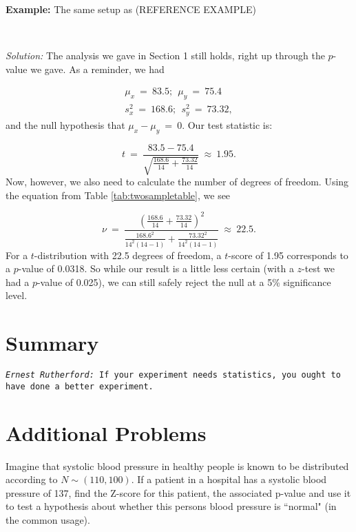 \textbf{Example:}  The same setup as (REFERENCE EXAMPLE)

~

\emph{Solution:}  The analysis we gave in Section 1 still holds, right up through the $p$-value we gave. As a reminder, we had

\begin{eqnarray}
\mu_x\ = \ 83.5;\ \ \mu_y\ = \ 75.4 \nonumber\\ s^2_x\ = \ 168.6;\ \ s^2_y\ = \ 73.32,
\end{eqnarray}
and the null hypothesis that $\mu_x - \mu_y\ = \ 0$.  Our test statistic is:

\begin{equation*}
t\ = \ \frac{83.5-75.4}{\sqrt{\frac{168.6}{14}+\frac{73.32}{14}}}\ \approx \ 1.95.
\end{equation*}
Now, however, we also need to calculate the number of degrees of freedom.  Using the equation from Table \ref{tab:twosampletable}, we see

\begin{equation*}
\nu\ = \ \frac{\left(\frac{168.6}{14} + \frac{73.32}{14}\right)^2}{\frac{168.6^2}{14^2\left(14 - 1\right)} + \frac{73.32^2}{14^2\left(14 - 1\right)}}\ \approx \ 22.5.
\end{equation*}
For a $t$-distribution with 22.5 degrees of freedom, a $t$-score of 1.95 corresponds to a $p$-value of 0.0318.  So while our result is a little less certain (with a $z$-test we had a $p$-value of 0.025), we can still safely reject the null at a 5\% significance level.


\section{Summary}

\noindent \texttt{\emph{Ernest Rutherford:} If your experiment needs statistics, you ought to have done a better experiment.}


\section{Additional Problems}

\begin{exe} Imagine that systolic blood pressure in healthy people  is known to be distributed according to $N \sim (110,100)$. If a patient in a hospital has a systolic blood pressure of 137, find the Z-score for this patient, the associated p-value and use it to test a hypothesis about whether this persons blood pressure is ``normal" (in the common usage). \end{exe}

